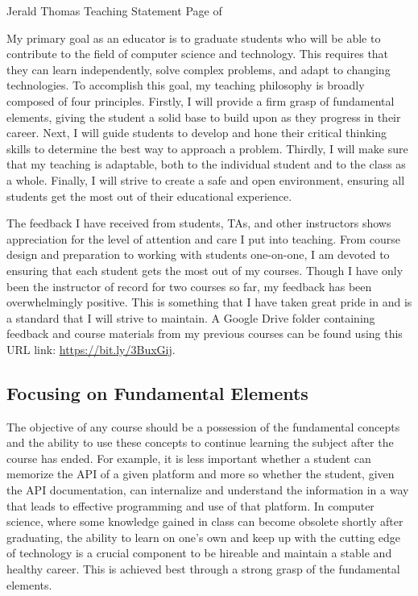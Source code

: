 \newpage

\setcounter{page}{1}
\makecvfooter
  {Jerald Thomas}
  {Teaching Statement}
  {Page \thepage \hspace{1pt} of \pageref{teaching_last}}


\makecvheader[C]
\doublespacing


My primary goal as an educator is to graduate students who will be able to contribute to the field of computer science and technology. This requires that they can learn independently, solve complex problems, and adapt to changing technologies. To accomplish this goal, my teaching philosophy is broadly composed of four principles. Firstly, I will provide a firm grasp of fundamental elements, giving the student a solid base to build upon as they progress in their career. Next, I will guide students to develop and hone their critical thinking skills to determine the best way to approach a problem. Thirdly, I will make sure that my teaching is adaptable, both to the individual student and to the class as a whole. Finally, I will strive to create a safe and open environment, ensuring all students get the most out of their educational experience.

The feedback I have received from students, TAs, and other instructors shows appreciation for the level of attention and care I put into teaching. From course design and preparation to working with students one-on-one, I am devoted to ensuring that each student gets the most out of my courses. Though I have only been the instructor of record for two courses so far, my feedback has been overwhelmingly positive. This is something that I have taken great pride in and is a standard that I will strive to maintain. A Google Drive folder containing feedback and course materials from my previous courses can be found using this URL link: \url{https://bit.ly/3BuxGij}.

\subsection*{Focusing on Fundamental Elements}
The objective of any course should be a possession of the fundamental concepts and the ability to use these concepts to continue learning the subject after the course has ended. For example, it is less important whether a student can memorize the API of a given platform and more so whether the student, given the API documentation, can internalize and understand the information in a way that leads to effective programming and use of that platform. In computer science, where some knowledge gained in class can become obsolete shortly after graduating, the ability to learn on one's own and keep up with the cutting edge of technology is a crucial component to be hireable and maintain a stable and healthy career. This is achieved best through a strong grasp of the fundamental elements.

